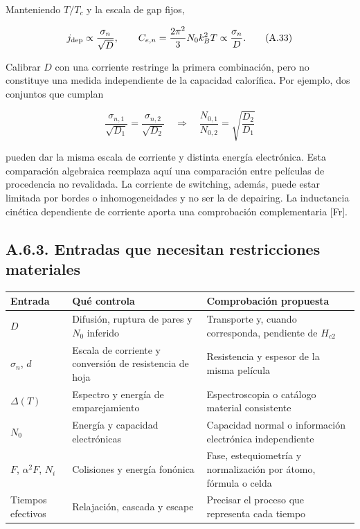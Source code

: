 \documentclass[
  spanish,
  10pt,
  a4paper,
]{article}
\newcounter{none} %
\begin{document}
Manteniendo \(T/T_c\) y la escala de gap fijos,

\[
j_{\rm dep}\propto\frac{\sigma_n}{\sqrt D},
\qquad C_{e,n}=\frac{2\pi^2}{3}N_0k_B^2T
\propto\frac{\sigma_n}{D}.
\tag{A.33}
\]

Calibrar \(D\) con una corriente restringe la primera combinación, pero
no constituye una medida independiente de la capacidad calorífica. Por
ejemplo, dos conjuntos que cumplan

\[
\frac{\sigma_{n,1}}{\sqrt{D_1}}
=\frac{\sigma_{n,2}}{\sqrt{D_2}}
\quad\Longrightarrow\quad
\frac{N_{0,1}}{N_{0,2}}=\sqrt{\frac{D_2}{D_1}}
\tag{A.34}
\]

pueden dar la misma escala de corriente y distinta energía electrónica.
Esta comparación algebraica reemplaza aquí una comparación entre
películas de procedencia no revalidada. La corriente de switching,
además, puede estar limitada por bordes o inhomogeneidades y no ser la
de depairing. La inductancia cinética dependiente de corriente aporta
una comprobación complementaria {[}Fr{]}.

\subsection{A.6.3. Entradas que necesitan restricciones
materiales}\label{a.6.3.-entradas-que-necesitan-restricciones-materiales}

{\def\LTcaptype{none} %
\begin{longtable}[]{@{}
  >{\raggedright\arraybackslash}p{}
  >{\raggedright\arraybackslash}p{}
  >{\raggedright\arraybackslash}p{}@{}}
\toprule\noalign{}
\begin{minipage}[b]{\linewidth}\raggedright
Entrada
\end{minipage} & \begin{minipage}[b]{\linewidth}\raggedright
Qué controla
\end{minipage} & \begin{minipage}[b]{\linewidth}\raggedright
Comprobación propuesta
\end{minipage} \\
\midrule\noalign{}
\endhead
\bottomrule\noalign{}
\endlastfoot
\(D\) & Difusión, ruptura de pares y \(N_0\) inferido & Transporte y,
cuando corresponda, pendiente de \(H_{c2}\) \\
\(\sigma_n\), \(d\) & Escala de corriente y conversión de resistencia de
hoja & Resistencia y espesor de la misma película \\
\(\Delta(T)\) & Espectro y energía de emparejamiento & Espectroscopia o
catálogo material consistente \\
\(N_0\) & Energía y capacidad electrónicas & Capacidad normal o
información electrónica independiente \\
\(F\), \(\alpha^2F\), \(N_i\) & Colisiones y energía fonónica & Fase,
estequiometría y normalización por átomo, fórmula o celda \\
Tiempos efectivos & Relajación, cascada y escape & Precisar el proceso
que representa cada tiempo \\
\end{longtable}
}
\end{document}
